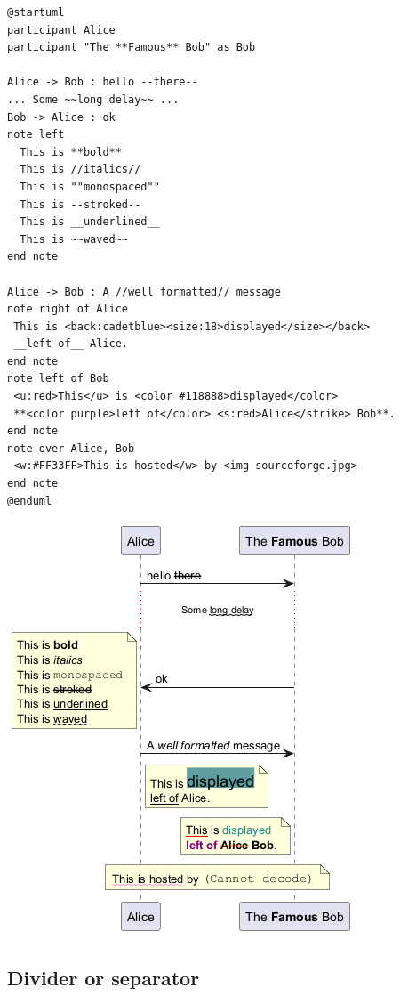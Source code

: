\begin{verbatim}
@startuml
participant Alice
participant "The **Famous** Bob" as Bob

Alice -> Bob : hello --there--
... Some ~~long delay~~ ...
Bob -> Alice : ok
note left
  This is **bold**
  This is //italics//
  This is ""monospaced""
  This is --stroked--
  This is __underlined__
  This is ~~waved~~
end note

Alice -> Bob : A //well formatted// message
note right of Alice
 This is <back:cadetblue><size:18>displayed</size></back>
 __left of__ Alice.
end note
note left of Bob
 <u:red>This</u> is <color #118888>displayed</color>
 **<color purple>left of</color> <s:red>Alice</strike> Bob**.
end note
note over Alice, Bob
 <w:#FF33FF>This is hosted</w> by <img sourceforge.jpg>
end note
@enduml
\end{verbatim}
\begin{center}
\includegraphics[scale=0.60]{imgw/img-b29fecf37e95604e3ca76b3f9a0183e8.png}
\end{center}


%
%
\subsection{Divider or separator}




